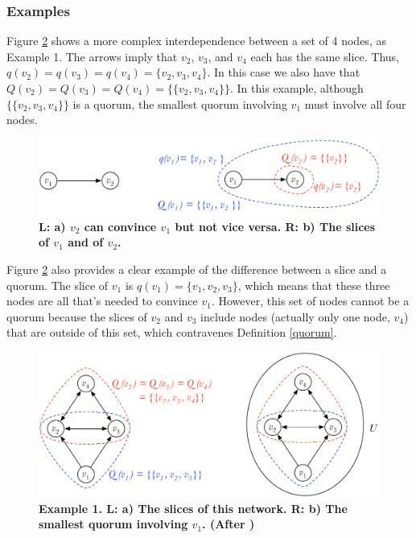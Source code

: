 \subsubsection{Examples\\}
Figure \ref{fig:example1} shows a more complex interdependence between a set of 4 nodes, as Example 1. The arrows imply that $v_2$, $v_3$, and $v_4$ each has the same slice. Thus, $q(v_2) = q(v_3) = q(v_4) = \{ v_2, v_3, v_4 \}$. In this case we also have that $Q(v_2) = Q(v_3) = Q(v_4) = \{\{ v_2, v_3, v_4 \} \}$. In this example, although $\{\{ v_2, v_3, v_4 \} \}$ is a quorum, the smallest quorum involving $v_1$ must involve all four nodes.

\begin{figure}[H]
\centering
\includegraphics[width=15 cm]{Figures/convincing}
\caption{\bf \small L: a) $v_2$ can convince $v_1$ but not vice versa. R: b) The slices of $v_1$ and of $v_2$.}
\label{fig:convincing}
\end{figure}

Figure \ref{fig:example1} also provides a clear example of the difference between a slice and a quorum. The slice of $v_1$ is $q(v_1) = \{ v_1, v_2, v_3 \}$, which means that these three nodes are all that's needed to convince $v_1$. However, this set of nodes cannot be a quorum because the slices of $v_2$ and $v_3$ include nodes (actually only one node, $v_4$) that are outside of this set, which contravenes Definition \ref{quorum}.

\begin{figure}[h]
\centering
\includegraphics[width=15 cm]{Figures/example1}
\caption{\bf \small Example 1. L: a) The slices of this network. R: b) The smallest quorum involving $v_1$. (After \cite{Mazieres2016})}
\label{fig:example1}
\end{figure}

